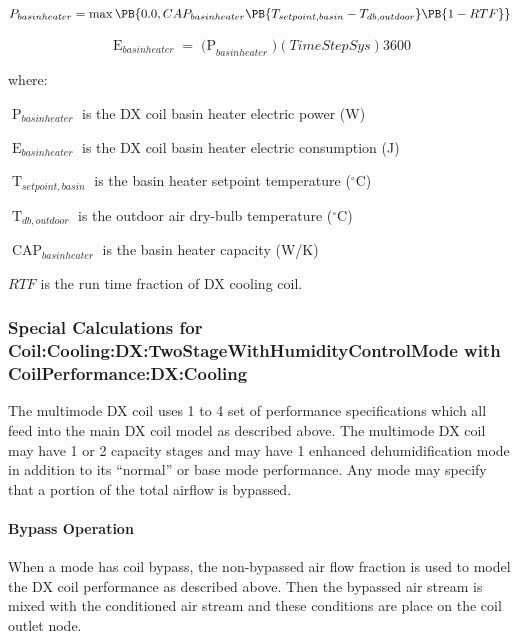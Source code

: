 \begin{equation}
 P_{basinheater} = \max\PB{0.0, CAP_{basinheater} \PB{T_{setpoint,basin} - T_{db,outdoor} }\PB{1 - RTF}}
\end{equation}

\begin{equation}
  \mathop E\nolimits_{basinheater} = \mathop {(P}\nolimits_{basinheater} )(TimeStepSys)3600
\end{equation}

where:

\(\mathop P\nolimits_{basinheater}\) is the DX coil basin heater electric power (W)

\(\mathop E\nolimits_{basinheater}\) is the DX coil basin heater electric consumption (J)

\(\mathop T\nolimits_{setpoint,basin}\) is the basin heater setpoint temperature (\(^{\circ}\)C)

\(\mathop T\nolimits_{db,outdoor}\) is the outdoor air dry-bulb temperature (\(^{\circ}\)C)

\(\mathop {CAP}\nolimits_{basinheater}\) is the basin heater capacity (W/K)

\(RTF\) is the run time fraction of DX cooling coil.

\subsubsection{Special Calculations for Coil:Cooling:DX:TwoStageWithHumidityControlMode with CoilPerformance:DX:Cooling}\label{special-calculations-for-coilcoolingdxtwostagewithhumiditycontrolmode-with-coilperformancedxcooling}

The multimode DX coil uses 1 to 4 set of performance specifications which all feed into the main DX coil model as described above. The multimode DX coil may have 1 or 2 capacity stages and may have 1 enhanced dehumidification mode in addition to its ``normal'' or base mode performance. Any mode may specify that a portion of the total airflow is bypassed.

\paragraph{Bypass Operation}\label{bypass-operation}

When a mode has coil bypass, the non-bypassed air flow fraction is used to model the DX coil performance as described above. Then the bypassed air stream is mixed with the conditioned air stream and these conditions are place on the coil outlet node.

